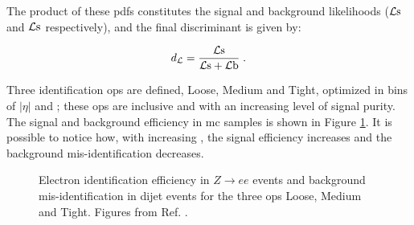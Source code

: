 The product of these \glspl{pdf} constitutes the 
signal and background likelihoods ($\mathcal{L}\rm s$ and $\mathcal{L}\rm s$ respectively), and the final discriminant is given by:

\begin{equation}
 d_\mathcal{L} = \frac{\mathcal{L}\rm s}{\mathcal{L}\rm s + \mathcal{L}\rm b} \; . \nonumber
\end{equation} 

Three identification \glspl{op} are defined, Loose, Medium and Tight, optimized in bins of $|\eta|$ and \et;
these \glspl{op} are inclusive and with an increasing level of signal purity.
The signal and background efficiency in \gls{mc} samples is shown in Figure \ref{fig:obj:ele_eff}. It is possible to notice how, with increasing
\et, the signal efficiency increases and the background mis-identification decreases.
 
\begin{figure}[h]
\begin{center}
\end{center}
 \caption{ Electron identification efficiency in $Z\rightarrow e e$ events and  background mis-identification in dijet events for the three \glspl{op} Loose, Medium and Tight. Figures from Ref. \cite{ATLAS-CONF-2016-024}.
 }
  \label{fig:obj:ele_eff}
\end{figure}


